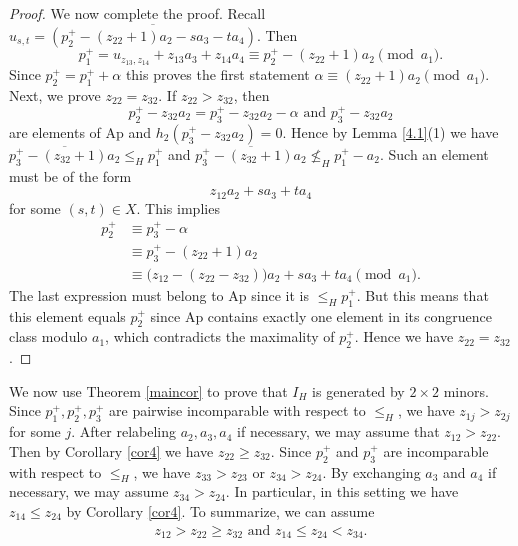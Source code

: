 \documentclass[12pt]{amsart}
\numberwithin{equation}{section}
\theoremstyle{definition}
\newcommand{\Ap}{\mathrm{Ap}}
\begin{document}
\begin{proof}
We now complete the proof.
Recall $u_{s,t}=\overline{(p_2^+-(z_{22}+1)a_2-sa_3-ta_4)}$. Then
\[ p^+_1=u_{z_{13},z_{14}}+z_{13}a_3+z_{14}a_4 \equiv p_2^+-(z_{22}+1)a_2 \pmod {a_1}.
\]
Since $p_2^+=p_1^++\alpha$ this proves the first statement
$\alpha \equiv (z_{22}+1)a_2 \pmod {a_1}$.
Next, we prove $z_{22}=z_{32}$.
If $z_{22}>z_{32}$, then
\[p^+_2-z_{32}a_2=p^+_3-z_{32}a_2-\alpha \text{ and } p^+_3-z_{32}a_2\]
are elements of $\Ap$ and $h_2(p^+_3-z_{32}a_2)=0$.
Hence by Lemma \ref{4.1}(1) we have
$\overline{p^+_3-(z_{32}+1)a_2}\leq_H p^+_1$ and
$\overline{p^+_3-(z_{32}+1)a_2} \not \leq _H p_1^+-a_2$.
Such an element must be of the form
\[z_{12}a_2+s a_3+ta_4\]
for some $(s,t) \in X$.
This implies
\begin{align*}
p_2^+
&\equiv p_3^+-\alpha\\
&\equiv p_3^+-(z_{22}+1)a_2\\
&\equiv
\bigl(z_{12}-(z_{22}-z_{32})\bigr)a_2
+sa_3+ta_4
\pmod{a_1}.
\end{align*}
The last expression must belong to $\Ap$ 
since it is $\leq_H p_1^+$.
But this means that this element equals $p^+_2$ since $\Ap$ contains exactly one element in its congruence class modulo $a_1$,
which contradicts the maximality of $p_2^+$.
Hence we have $z_{22}=z_{32}$.
\end{proof}



We now use Theorem \ref{maincor} to prove that $I_H$ is generated
by $2\times2$ minors.
Since $p_1^+,p_2^+,p_3^+$ are pairwise incomparable
with respect to $\leq_H$,
we have $z_{1j}>z_{2j}$ for some $j$.
After relabeling $a_2,a_3,a_4$ if necessary, we may assume that
$z_{12}>z_{22}$.
Then by Corollary \ref{cor4} we have $z_{22}\geq z_{32}$.
Since $p^+_2$ and $p^+_3$ are incomparable with respect to $\leq _H$,
we have $z_{33}>z_{23}$ or $z_{34}>z_{24}$.
By exchanging $a_3$ and $a_4$ if necessary,
we may assume $z_{34}>z_{24}$.
In particular, in this setting we have $z_{14} \leq z_{24}$ by Corollary \ref{cor4}.
To summarize, we can assume
\begin{align}
\label{katei}
z_{12}> z_{22} \geq z_{32} \text{ and } z_{14} \leq z_{24} < z_{34}.
\end{align}
\end{document}

